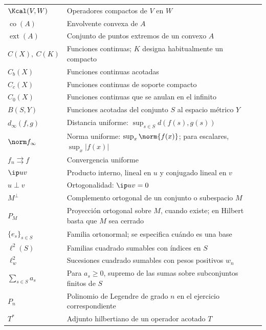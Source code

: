 \begin{longtable}{@{}p{}p{}r@{}}
$\Kcal(V,W)$ & Operadores compactos de $V$ en $W$ & \pageref{chap:23}\\
$\operatorname{co}(A)$ & Envolvente convexa de $A$ & \pageref{chap:24}\\
$\operatorname{ext}(A)$ & Conjunto de puntos extremos de un convexo $A$ & \pageref{chap:24}\\
$C(X),\ C(K)$ & Funciones continuas; $K$ designa habitualmente un compacto & \pageref{chap:25}\\
$C_b(X)$ & Funciones continuas acotadas & \pageref{chap:25}\\
$C_c(X)$ & Funciones continuas de soporte compacto & \pageref{chap:25}\\
$C_0(X)$ & Funciones continuas que se anulan en el infinito & \pageref{chap:25}\\
$B(S,Y)$ & Funciones acotadas del conjunto $S$ al espacio métrico $Y$ & \pageref{chap:25}\\
$d_\infty(f,g)$ & Distancia uniforme: $\sup_{s\in S}d(f(s),g(s))$ & \pageref{chap:25}\\
$\norm f_\infty$ & Norma uniforme: $\sup_x\norm{f(x)}$; para escalares, $\sup_x|f(x)|$ & \pageref{chap:25}\\
$f_n\rightrightarrows f$ & Convergencia uniforme & \pageref{chap:26}\\
$\ip uv$ & Producto interno, lineal en $u$ y conjugado lineal en $v$ & \pageref{chap:29}\\
$u\perp v$ & Ortogonalidad: $\ip uv=0$ & \pageref{chap:29}\\
$M^\perp$ & Complemento ortogonal de un conjunto o subespacio $M$ & \pageref{chap:29}\\
$P_M$ & Proyección ortogonal sobre $M$, cuando existe; en Hilbert basta que $M$ sea cerrado & \pageref{chap:30}\\
$\{e_s\}_{s\in S}$ & Familia ortonormal; se especifica cuándo es una base & \pageref{chap:31}\\
$\ell^2(S)$ & Familias cuadrado sumables con índices en $S$ & \pageref{chap:29}\\
$\ell^2_w$ & Sucesiones cuadrado sumables con pesos positivos $w_n$ & \pageref{chap:29}\\
$\sum_{s\in S}a_s$ & Para $a_s\ge0$, supremo de las sumas sobre subconjuntos finitos de $S$ & \pageref{chap:29}\\
$P_n$ & Polinomio de Legendre de grado $n$ en el ejercicio correspondiente & \pageref{chap:31}\\
$T^*$ & Adjunto hilbertiano de un operador acotado $T$ & \pageref{chap:32}\\

\end{longtable}
